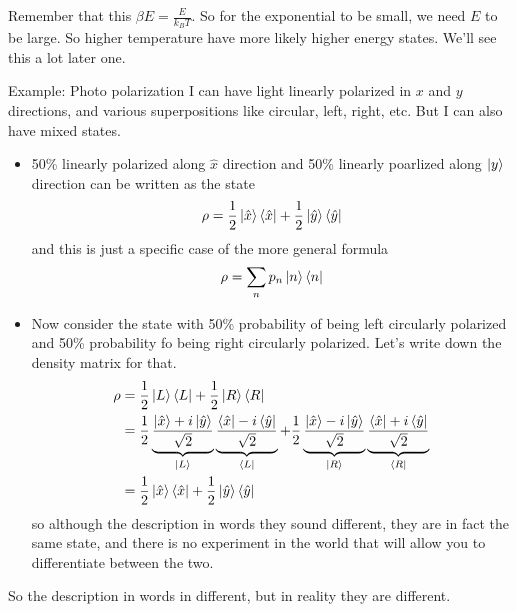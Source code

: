 Remember that this $\beta E = \frac{E}{k_B T}$.
So for the exponential to be small,
we need $E$ to be large.
So higher temperature have more likely higher energy states.
We'll see this a lot later one.


Example: Photo polarization
I can have light linearly polarized in $x$ and $y$ directions,
and various superpositions like circular, left, right, etc.
But I can also have mixed states.
\begin{itemize}
    \item 50\% linearly polarized along $\hat{x}$ direction and
        50\% linearly poarlized along $\ket{y}$ direction
        can be written as the state
        \begin{align}
            \rho =
            \frac{1}{2}\ket{\hat{x}}\bra{\hat{x}}
            + \frac{1}{2}\ket{\hat{y}}\bra{\hat{y}}
        \end{align}
        and this is just a specific case of the more general formula
        \begin{align}
            \rho = \sum_n p_n \ket{n}\bra{n}
        \end{align}
    \item Now consider the state with
        50\% probability of being left circularly polarized
        and 50\% probability fo being right circularly polarized.
        Let's write down the density matrix for that.
        \begin{align}
            \rho &=
            \frac{1}{2} \ket{L}\bra{L}
            + \frac{1}{2} \ket{R}\bra{R}\\
            &=
            \frac{1}{2}
            \underbrace{
                \frac{
                    \ket{\hat{x}} + i\ket{\hat{y}}
                }{\sqrt{2}}
            }_{\ket{L}}
            \underbrace{
                \frac{
                    \bra{\hat{x}} - i\bra{\hat{y}}
                }{\sqrt{2}}
            }_{\bra{L}}
            + \frac{1}{2}
            \underbrace{
                \frac{
                    \ket{\hat{x}} - i\ket{\hat{y}}
                }{\sqrt{2}}
            }_{\ket{R}}
            \underbrace{
                \frac{
                    \bra{\hat{x}} + i\bra{\hat{y}}
                }{\sqrt{2}}
            }_{\bra{R}}\\
            &= \frac{1}{2}\ket{\hat{x}}\bra{\hat{x}}
            + \frac{1}{2}\ket{\hat{y}}\bra{\hat{y}}
        \end{align}
        so although the description in words they sound different,
        they are in fact the same state,
        and there is no experiment in the world that will allow you to
        differentiate between the two.
\end{itemize}
So the description in words in different,
but in reality they are different.

